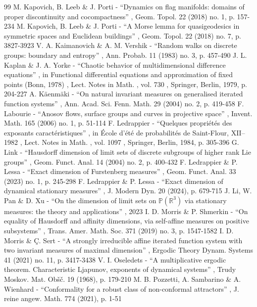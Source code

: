 \documentclass[10pt]{amsart}
\begin{document}
\begin{thebibliography}{99}
 M. Kapovich, B. Leeb \& J. Porti - “Dynamics on flag manifolds: domains of proper discontinuity and cocompactness” , Geom. Topol. 22 (2018) no. 1, p. 157-234
 M. Kapovich, B. Leeb \& J. Porti - “A Morse lemma for quasigeodesics in symmetric spaces and Euclidean buildings” , Geom. Topol. 22 (2018) no. 7, p. 3827-3923
 V. A. Kaimanovich \& A. M. Vershik - “Random walks on discrete groups: boundary and entropy” , Ann. Probab. 11 (1983) no. 3, p. 457-490
 J. L. Kaplan \& J. A. Yorke - “Chaotic behavior of multidimensional difference equations” , in Functional differential equations and approximation of fixed points (Bonn, 1978) , Lect. Notes in Math. , vol. 730 , Springer, Berlin, 1979, p. 204-227
 A. Käenmäki - “On natural invariant measures on generalised iterated function systems” , Ann. Acad. Sci. Fenn. Math. 29 (2004) no. 2, p. 419-458
 F. Labourie - “Anosov flows, surface groups and curves in projective space” , Invent. Math. 165 (2006) no. 1, p. 51-114
 F. Ledrappier - “Quelques propriétés des exposants caractéristiques” , in École d’été de probabilités de Saint-Flour, XII–1982 , Lect. Notes in Math. , vol. 1097 , Springer, Berlin, 1984, p. 305-396
 G. Link - “Hausdorff dimension of limit sets of discrete subgroups of higher rank Lie groups” , Geom. Funct. Anal. 14 (2004) no. 2, p. 400-432
 F. Ledrappier \& P. Lessa - “Exact dimension of Furstenberg measures” , Geom. Funct. Anal. 33 (2023) no. 1, p. 245-298
 F. Ledrappier \& P. Lessa - “Exact dimension of dynamical stationary measures” , J. Modern Dyn. 20 (2024), p. 679-715
 J. Li, W. Pan \& D. Xu - “On the dimension of limit sets on $\mathbb{P} (\mathbb{R}^3)$ via stationary measures: the theory and applications” , 2023
 I. D. Morris \& P. Shmerkin - “On equality of Hausdorff and affinity dimensions, via self-affine measures on positive subsystems” , Trans. Amer. Math. Soc. 371 (2019) no. 3, p. 1547-1582
 I. D. Morris \& Ç. Sert - “A strongly irreducible affine iterated function system with two invariant measures of maximal dimension” , Ergodic Theory Dynam. Systems 41 (2021) no. 11, p. 3417-3438
 V. I. Oseledets - “A multiplicative ergodic theorem. Characteristic Ljapunov, exponents of dynamical systems” , Trudy Moskov. Mat. Obšč. 19 (1968), p. 179-210
 M. B. Pozzetti, A. Sambarino \& A. Wienhard - “Conformality for a robust class of non-conformal attractors” , J. reine angew. Math. 774 (2021), p. 1-51

\end{thebibliography}
\end{document}
